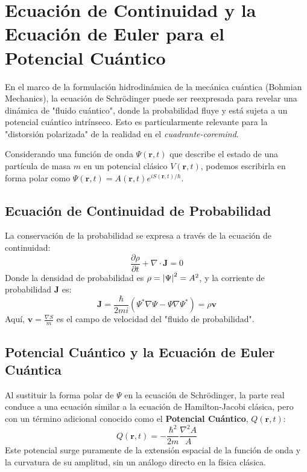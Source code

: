 \documentclass{book}
\begin{document}
\section*{Ecuación de Continuidad y la Ecuación de Euler para el Potencial Cuántico}
\label{sec:quantum_fluid}

En el marco de la formulación hidrodinámica de la mecánica cuántica (Bohmian Mechanics), la ecuación de Schrödinger puede ser reexpresada para revelar una dinámica de "fluido cuántico", donde la probabilidad fluye y está sujeta a un potencial cuántico intrínseco. Esto es particularmente relevante para la "distorsión polarizada" de la realidad en el \textit{cuadrante-coremind}.

Considerando una función de onda $\Psi(\mathbf{r}, t)$ que describe el estado de una partícula de masa $m$ en un potencial clásico $V(\mathbf{r}, t)$, podemos escribirla en forma polar como $\Psi(\mathbf{r}, t) = A(\mathbf{r}, t) e^{i S(\mathbf{r}, t)/\hbar}$.

\subsection*{Ecuación de Continuidad de Probabilidad}
La conservación de la probabilidad se expresa a través de la ecuación de continuidad:
\begin{equation}
    \frac{\partial \rho}{\partial t} + \nabla \cdot \mathbf{J} = 0
    \label{eq:continuity_quantum}
\end{equation}
Donde la densidad de probabilidad es $\rho = \abs{\Psi}^2 = A^2$, y la corriente de probabilidad $\mathbf{J}$ es:
\begin{equation}
    \mathbf{J} = \frac{\hbar}{2mi} (\Psi^* \nabla \Psi - \Psi \nabla \Psi^*) = \rho \mathbf{v}
    \label{eq:current_quantum}
\end{equation}
Aquí, $\mathbf{v} = \frac{\nabla S}{m}$ es el campo de velocidad del "fluido de probabilidad".

\subsection*{Potencial Cuántico y la Ecuación de Euler Cuántica}
Al sustituir la forma polar de $\Psi$ en la ecuación de Schrödinger, la parte real conduce a una ecuación similar a la ecuación de Hamilton-Jacobi clásica, pero con un término adicional conocido como el \textbf{Potencial Cuántico}, $Q(\mathbf{r}, t)$:
\begin{equation}
    Q(\mathbf{r}, t) = -\frac{\hbar^2}{2m} \frac{\nabla^2 A}{A}
    \label{eq:quantum_potential}
\end{equation}
Este potencial surge puramente de la extensión espacial de la función de onda y la curvatura de su amplitud, sin un análogo directo en la física clásica.
\end{document}

